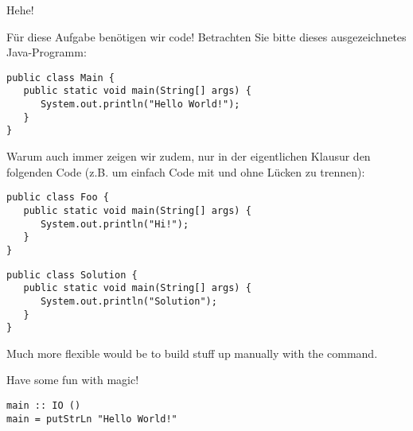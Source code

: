 \begin{Exercise}[5]{Hehe!}
\label{ex:second}%

Für diese Aufgabe benötigen wir code!
Betrachten Sie bitte dieses ausgezeichnetes Java-Programm:

\begin{verbatim}
public class Main {
   public static void main(String[] args) {
      System.out.println("Hello World!");
   }
}
\end{verbatim}

\begin{examonly}
Warum auch immer zeigen wir zudem, nur in der eigentlichen Klausur den folgenden Code (z.B. um einfach Code mit und ohne Lücken zu trennen):
\begin{verbatim}
public class Foo {
   public static void main(String[] args) {
      System.out.println("Hi!");
   }
}
\end{verbatim}
\end{examonly}

\begin{solution}
\begin{verbatim}
public class Solution {
   public static void main(String[] args) {
      System.out.println("Solution");
   }
}
\end{verbatim}
\end{solution}

Much more flexible would be to build stuff up manually with the \string\ifinmode\space command.

\begin{solutionbox}
   Have some fun with magic!

\begin{verbatim}
main :: IO ()
main = putStrLn "Hello World!"
\end{verbatim}
\end{solutionbox}
\fi

\end{Exercise}
